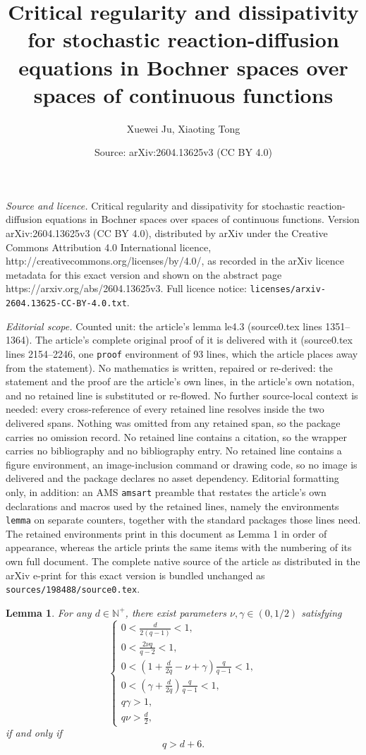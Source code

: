 \documentclass[10pt,a4paper]{amsart}
\title{Critical regularity and dissipativity for stochastic reaction-diffusion equations in Bochner spaces over spaces of continuous functions}
\author{Xuewei Ju, Xiaoting Tong}
\date{Source: arXiv:2604.13625v3 (CC BY 4.0)}
\newtheorem{lemma}{Lemma}
\def\gam{\gamma}
\begin{document}
\maketitle

\noindent\emph{Source and licence.} Critical regularity and dissipativity for stochastic reaction-diffusion equations in Bochner spaces over spaces of continuous functions. Version arXiv:2604.13625v3 (CC BY 4.0), distributed by arXiv under the Creative Commons Attribution 4.0 International licence, http://creativecommons.org/licenses/by/4.0/, as recorded in the arXiv licence metadata for this exact version and shown on the abstract page https://arxiv.org/abs/2604.13625v3. Full licence notice: \texttt{licenses/arxiv-2604.13625-CC-BY-4.0.txt}.\par\smallskip

\noindent\textit{Editorial scope.} Counted unit: the article's lemma le4.3 (source0.tex lines 1351--1364). The article's complete original proof of it is delivered with it (source0.tex lines 2154--2246, one \texttt{proof} environment of 93 lines, which the article places away from the statement). No mathematics is written, repaired or re-derived: the statement and the proof are the article's own lines, in the article's own notation, and no retained line is substituted or re-flowed.  No further source-local context is needed: every cross-reference of every retained line resolves inside the two delivered spans.  Nothing was omitted from any retained span, so the package carries no omission record.  No retained line contains a citation, so the wrapper carries no bibliography and no bibliography entry.  No retained line contains a figure environment, an image-inclusion command or drawing code, so no image is delivered and the package declares no asset dependency.  Editorial formatting only, in addition: an AMS \texttt{amsart} preamble that restates the article's own declarations and macros used by the retained lines, namely the environments \texttt{lemma} on separate counters, together with the standard packages those lines need.  The retained environments print in this document as Lemma 1 in order of appearance, whereas the article prints the same items with the numbering of its own full document.  The complete native source of the article as distributed in the arXiv e-print for this exact version is bundled unchanged as \texttt{sources/198488/source0.tex}.
\begin{lemma}\label{le4.3}
For any $d\in\mathbb N^+$, there exist parameters $\nu,\gamma\in(0,1/2)$ satisfying
$$
\begin{cases}
0<\frac{d}{2(q-1)}<1,\\[0.3em]
0<\frac{2\nu q}{q-2}<1,\\[0.3em]
0<\left(1+\frac{d}{2q}-\nu+\gam\right)\frac{q}{q-1}<1,\\[0.3em]
0<(\gamma+\frac{d}{2q})\frac{q}{q-1}<1,\\[0.3em]
q\gamma>1,\\[0.3em]
q\nu>\frac{d}{2},
\end{cases}
$$
if and only if $$q>d+6.$$ %
\end{lemma}
\end{document}

